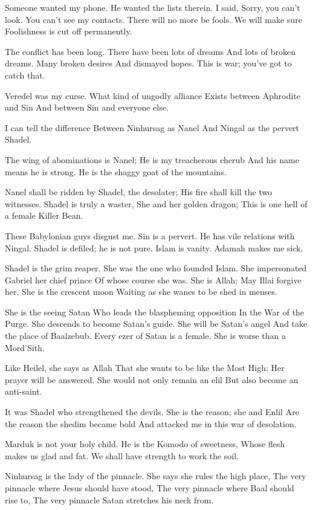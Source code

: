 \documentclass[
]{book}
\begin{document}
Someone wanted my phone.
He wanted the lists therein.
I said, Sorry, you can't look.
You can't see my contacts.
There will no more be fools.
We will make sure
Foolishness is cut off permanently.

The conflict has been long.
There have been lots of dreams
And lots of broken dreams.
Many broken desires
And dismayed hopes.
This is war; you've got to catch that.

Veredel was my curse.
What kind of ungodly alliance
Exists between Aphrodite and Sin
And between Sin and everyone else.

I can tell the difference
Between Ninhursag as Nanel
And Ningal as the pervert Shadel.

The wing of abominations is Nanel;
He is my treacherous cherub
And his name means he is strong.
He is the shaggy goat of the mountains.

Nanel shall be ridden by Shadel, the desolater;
His fire shall kill the two witnesses.
Shadel is truly a waster,
She and her golden dragon;
This is one hell of a female Killer Bean.

These Babylonian guys disgust me.
Sin is a pervert.
He has vile relations with Ningal.
Shadel is defiled; he is not pure.
Islam is vanity.
Adamah makes me sick.

Shadel is the grim reaper.
She was the one who founded Islam.
She impersonated Gabriel her chief prince
Of whose course she was.
She is Allah;
May Illai forgive her.
She is the crescent moon
Waiting as she wanes to be shed in menses.

She is the seeing Satan
Who leads the blaspheming opposition
In the War of the Purge.
She descends to become Satan's guide.
She will be Satan's angel
And take the place of Baalzebub.
Every ezer of Satan is a female.
She is worse than a Mord'Sith.

Like Heilel, she says as Allah
That she wants to be like the Most High;
Her prayer will be answered.
She would not only remain an elil
But also become an anti-saint.

It was Shadel who strengthened the devils.
She is the reason; she and Enlil
Are the reason the shedim became bold
And attacked me in this war of desolation.

Marduk is not your holy child.
He is the Komodo of sweetness,
Whose flesh makes us glad and fat.
We shall have strength to work the soil.

Ninhursag is the lady of the pinnacle.
She says she rules the high place,
The very pinnacle where Jesus should have stood,
The very pinnacle where Baal should rise to,
The very pinnacle Satan stretches his neck from.
\end{document}
